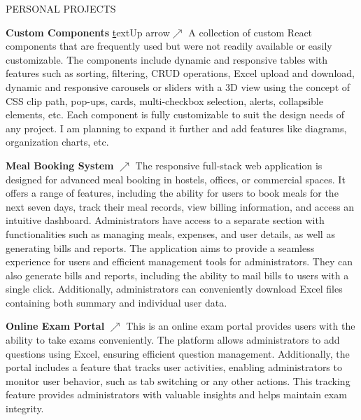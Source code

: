 \documentclass{resume} %
\begin{document}
\begin{rSection}{PERSONAL PROJECTS}
\vspace{-1.25em}






\item \textbf{Custom Components}
\href{https://custom-components-orpin.vercel.app/}text{Up arrow}{\texorpdfstring{\(\nearrow\)}{nearrow}}
{A collection of custom React components that are frequently used but were not readily available or easily customizable. The components include dynamic and responsive tables with features such as sorting, filtering, CRUD operations, Excel upload and download, dynamic and responsive carousels or sliders with a 3D view using the concept of CSS clip path, pop-ups, cards, multi-checkbox selection, alerts, collapsible elements, etc. Each component is fully customizable to suit the design needs of any project. I am planning to expand it further and add features like diagrams, organization charts, etc.}



\item \textbf{Meal Booking System}
\href{https://meal-booking-system.vercel.app/}{\texorpdfstring{\(\nearrow\)}{nearrow}}
{
The responsive full-stack web application is designed for advanced meal booking in hostels, offices, or commercial spaces. It offers a range of features, including the ability for users to book meals for the next seven days, track their meal records, view billing information, and access an intuitive dashboard. Administrators have access to a separate section with functionalities such as managing meals, expenses, and user details, as well as generating bills and reports. The application aims to provide a seamless experience for users and efficient management tools for administrators. They can also generate bills and reports, including the ability to mail bills to users with a single click. Additionally, administrators can conveniently download Excel files containing both summary and individual user data.}





\item \textbf{Online Exam Portal}
\href{https://react-online-exam-portal.vercel.app/}{\texorpdfstring{\(\nearrow\)}{nearrow}}
{
This is an online exam portal provides users with the ability to take exams conveniently. The platform allows administrators to add questions using Excel, ensuring efficient question management. Additionally, the portal includes a feature that tracks user activities, enabling administrators to monitor user behavior, such as tab switching or any other actions. This tracking feature provides administrators with valuable insights and helps maintain exam integrity.}





\end{rSection}
\end{document}
